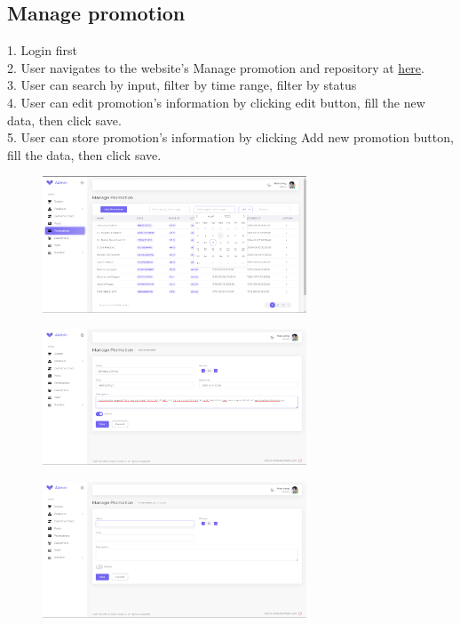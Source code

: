 \subsection{Manage promotion}
1. Login first \\
2. User navigates to the website's Manage promotion and repository at \href{https://coffee.skrt.cc/admin/promotion}{here}. \\
3. User can search by input, filter by time range, filter by status\\
4. User can edit promotion's information by clicking edit button, fill the new data, then click save.\\
5. User can store promotion's information by clicking Add new promotion button, fill the data, then click save.\\
\begin{figure}[H]
    \centering
    \includegraphics[width=0.7\textwidth]{Demo/Screenshot_17.png}
    \label{fig:supportpage}
\end{figure}
\begin{figure}[H]
    \centering
    \includegraphics[width=0.7\textwidth]{Demo/Screenshot_18.png}
    \label{fig:supportpage}
\end{figure}
\begin{figure}[H]
    \centering
    \includegraphics[width=0.7\textwidth]{Demo/Screenshot_19.png}
    \label{fig:supportpage}
\end{figure}

